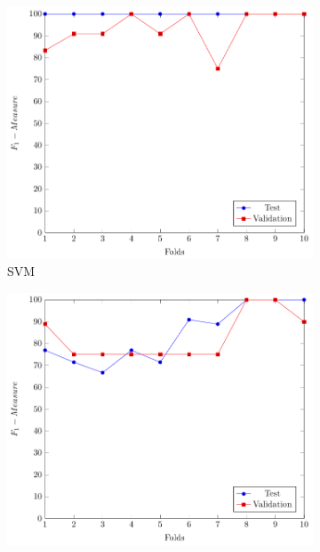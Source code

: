 \begin{figure}[ht]
	\centering
	\begin{subfigure}[b]{0.48\textwidth}
		\centering
		\includegraphics[width=\textwidth]{img/prai/svm_test_validation/svm_test_validation}
		\caption[Network2]%
		{{\small SVM}}    
		\label{fig:svm_val_test}
	\end{subfigure}
	\hfill
	\begin{subfigure}[b]{0.48\textwidth}  
		\centering 
		\includegraphics[width=\textwidth]{img/prai/svm_unbalanced_test_validation/svm_unbalanced_test_validation}

\end{subfigure}
\end{figure}
